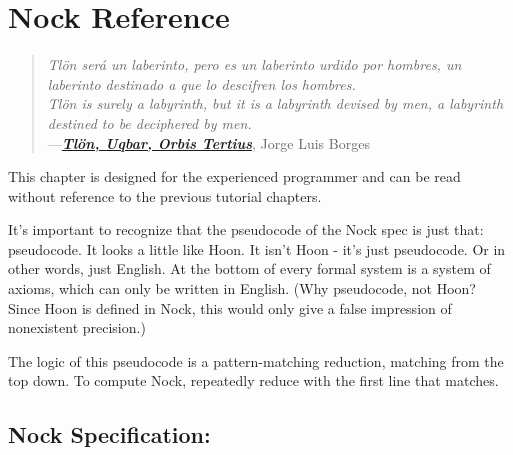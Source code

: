 \chapter{Nock Reference}

\begin{quote}
\noindent \emph{Tlön será un laberinto, pero es un laberinto urdido por hombres, un
laberinto destinado a que lo descifren los hombres.}
\medskip \\
\noindent \emph{Tlön is surely a labyrinth, but it is a labyrinth devised
by men, a labyrinth destined to be deciphered by men.}
\medskip \\
\noindent ---\href{https://en.wikipedia.org/wiki/Tlon,_Uqbar,_Orbis_Tertius}{\textbf{\emph{Tlön, Uqbar, Orbis Tertius}}}, Jorge Luis Borges
\end{quote}

This chapter is designed for the experienced programmer and can be read without reference to the previous tutorial chapters.

It's important to recognize that the pseudocode of the Nock spec is just that:
pseudocode.  It looks a little like Hoon.  It isn't Hoon - it's just
pseudocode.  Or in other words, just English.  At the bottom of every formal
system is a system of axioms, which can only be written in English.  (Why
pseudocode, not Hoon?  Since Hoon is defined in Nock, this would only give a
false impression of nonexistent precision.)

The logic of this pseudocode is a pattern-matching reduction, matching from the
top down.  To compute Nock, repeatedly reduce with the first line that matches.

\section{Nock Specification:}

